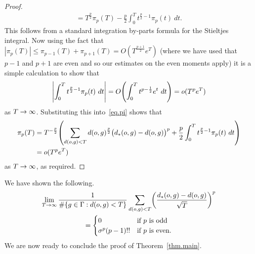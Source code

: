 \documentclass[AHL,Unicode,longabstracts,published]{cedram}
\newcommand{\G}{\Gamma}
\let\originalleft\left
\let\originalright\right
\renewcommand{\left}{\mathopen{}\mathclose\bgroup\originalleft}
\renewcommand{\right}{\aftergroup\egroup\originalright}
\renewcommand*{\to}{\mathchoice{\longrightarrow}{\rightarrow}{\rightarrow}{\rightarrow}}
\newcounter{setofcase}
\newcounter{case}[setofcase]
\theoremstyle{plain}
\newcommand{\G}{\Gamma}
\begin{document}
\begin{proof}
\begin{multline}
= T^{\frac{p}{2}} \pi_p(T) - \frac{p}{2} \int_0^T t^{\frac{p}{2} -1} \pi_
p(t) \ dt.
\end{multline}
This follows from a standard integration by-parts formula for the Stieltjes integral. Now using the fact that $|\pi_p(T)| \le \pi_{p-1}(T) +\pi_{p+1}(T) = O(T^{\frac{p+1}{2}} e^T)$ (where we have used that $p-1$ and $p+1$ are even and so our estimates on the even moments apply) it is a simple calculation to show that
\[
\left| \int_0^T t^{\frac{p}{2} -1} \pi_p(t) \ dt \right| =O\left(\int_0^T t^{p -\frac{1}{2}} e^t \ dt\right) = o(T^{p} e^T)
\]
as $T \to\infty$. Substituting this into~\eqref{eq.pi} shows that
\begin{align*}
\pi_p(T) &= T^{-\frac{p}{2}}\left(\sum_{d(o,g) < T} d(o,g)^{\frac{p}{2}} \bigl(d_\ast(o,g) - d(o,g)\bigr)^p + \frac{p}{2} \int_0^T t^{\frac{p}{2} -1} \pi_p(t) \ dt
\right)\\
&= o(T^p e^T)
\end{align*}
as $T\to\infty$, as required.
\end{proof}



We have shown the following.
\begin{multline*}
\lim_{T\to\infty} \frac{1}{\#\{ g\in\G: d(o,g) < T\}} \sum_{d(o,g) < T} \left(\frac{d_\ast(o,g) - d(o,g)}{\sqrt{T}} \right)^p \\
=
\begin{cases}
0  &\text{if $p$ is odd} \\
\sigma^p (p-1)!!  &\text{if $p$ is even.}
\end{cases}
\end{multline*}
We are now ready to conclude the proof of Theorem~\ref{thm.main}.
\end{document}

